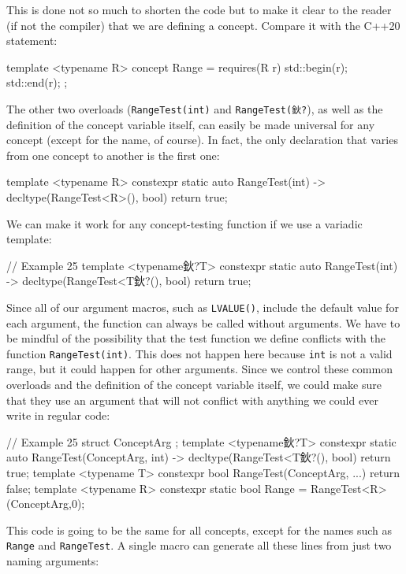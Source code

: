 This is done not so much to shorten the code but to make it clear to the reader (if not the compiler) that we are defining a concept. Compare it with the C++20 statement:

\begin{code}
template <typename R> concept Range =
  requires(R r) { std::begin(r); std::end(r); };
\end{code}

The other two overloads (\texttt{RangeTest(int)} and \texttt{RangeTest(鈥?}), as well as the definition of the concept variable itself, can easily be made universal for any concept (except for the name, of course). In fact, the only declaration that varies from one concept to another is the first one:

\begin{code}
template <typename R>
constexpr static auto RangeTest(int) ->
  decltype(RangeTest<R>(), bool{}) { return true; }
\end{code}

We can make it work for any concept-testing function if we use a variadic template:

\begin{code}
// Example 25
template <typename鈥?T>
constexpr static auto RangeTest(int) ->
  decltype(RangeTest<T鈥?(), bool{}) { return true; }
\end{code}

Since all of our argument macros, such as \texttt{LVALUE()}, include the default value for each argument, the function can always be called without arguments. We have to be mindful of the possibility that the test function we define conflicts with the function \texttt{RangeTest(int)}. This does not happen here because \texttt{int} is not a valid range, but it could happen for other arguments. Since we control these common overloads and the definition of the concept variable itself, we could make sure that they use an argument that will not conflict with anything we could ever write in regular code:

\begin{code}
// Example 25
struct ConceptArg {};
template <typename鈥?T>
constexpr static auto RangeTest(ConceptArg, int) ->
  decltype(RangeTest<T鈥?(), bool{}) { return true; }
template <typename T>
constexpr bool RangeTest(ConceptArg, ...) { return false; }
template <typename R>
constexpr static bool Range = RangeTest<R>(ConceptArg{},0);
\end{code}

This code is going to be the same for all concepts, except for the names such as \texttt{Range} and \texttt{RangeTest}. A single macro can generate all these lines from just two naming arguments:

